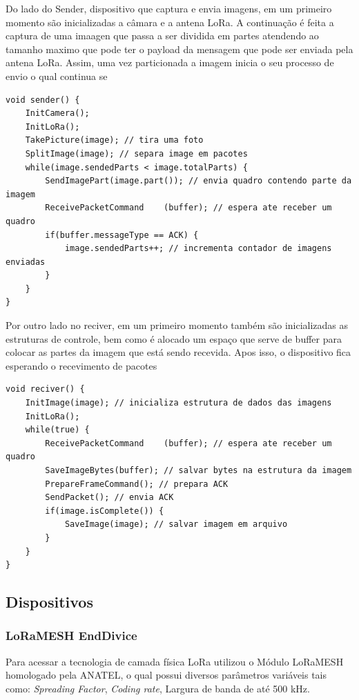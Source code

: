 \documentclass[
article,			%
12pt,				%
oneside,			%
a4paper,			%
english,			%
brazil,				%
sumario=tradicional
]{abntex2}
\begin{document}
Do lado do Sender, dispositivo que captura e envia imagens, em um primeiro momento são inicializadas a câmara e a antena LoRa. A continuação é feita a captura de uma imaagen que passa a ser dividida em partes atendendo ao tamanho maximo que pode ter o payload da mensagem que pode ser enviada pela antena LoRa. Assim, uma vez particionada a imagem inicia o seu processo de envio o qual continua se

\begin{lstlisting}[title=Algoritmo Stop and Wait - Sender]
void sender() {
	InitCamera();
	InitLoRa();
	TakePicture(image); // tira uma foto
	SplitImage(image); // separa image em pacotes
	while(image.sendedParts < image.totalParts) {
		SendImagePart(image.part()); // envia quadro contendo parte da imagem
		ReceivePacketCommand	(buffer); // espera ate receber um quadro
		if(buffer.messageType == ACK) {
			image.sendedParts++; // incrementa contador de imagens enviadas
		}
	}
}
\end{lstlisting}

Por outro lado no reciver, em um primeiro momento também são inicializadas as estruturas de controle, bem como é alocado um espaço que serve de buffer para colocar as partes da imagem que está sendo recevida. Apos isso, o dispositivo fica esperando o recevimento de pacotes

\begin{lstlisting}[title=Algoritmo Stop and Wait - Reciver]
void reciver() {
	InitImage(image); // inicializa estrutura de dados das imagens
	InitLoRa();
	while(true) {
		ReceivePacketCommand	(buffer); // espera ate receber um quadro
		SaveImageBytes(buffer); // salvar bytes na estrutura da imagem
		PrepareFrameCommand(); // prepara ACK
		SendPacket(); // envia ACK
		if(image.isComplete()) {
			SaveImage(image); // salvar imagem em arquivo
		}
	}
}
\end{lstlisting}

\cleardoublepage

\subsection{Dispositivos}\label{Dispositivos}

\subsubsection{LoRaMESH EndDivice}\label{LoRaMESH EndDivice}
Para acessar a tecnologia de camada física LoRa utilizou o Módulo LoRaMESH homologado pela ANATEL\cite{lora_radioenge}, o qual possui diversos parâmetros variáveis tais como: \textit{Spreading Factor}, \textit{Coding rate}, Largura de banda de até 500 kHz.
\end{document}
